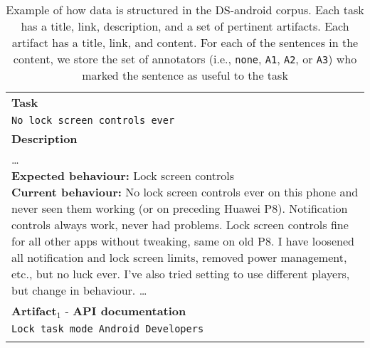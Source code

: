 \begin{landscape}
\begin{table}
\centering        
\caption{Example of how data is structured in the \acs{DS-android} corpus. Each task has a  title, link, description, and a set of pertinent artifacts. Each artifact has a title, link, and content. For each of the sentences in the content, we store the set of annotators (i.e., \texttt{none}, \texttt{A1}, \texttt{A2}, or \texttt{A3}) who marked the sentence as useful to the task }
\label{tbl:corpus-data-structure}    
\begin{scriptsize}
\begin{tabular}{cl}
\hline
\multicolumn{2}{l}{\cellcolor{lightgray}
    \textbf{Task}
}
\\
\multicolumn{2}{l}{\hspace{3mm}
\parbox[l][0.7cm][c]{16cm}{
    \texttt{No lock screen controls ever
}}}
\href{https://github.com/AntennaPod/AntennaPod/issues/3578}{link}
\\
\multicolumn{2}{l}{\cellcolor{lightgray}
    \textbf{Description}
}
\\
\multicolumn{2}{l}{
\hspace{3mm}
\parbox[l][2.5cm][c]{21cm}{
{\ttfamily
    \ldots
    \\
    \textbf{Expected behaviour:} Lock screen controls
    \\
    \textbf{Current behaviour:} No lock screen controls ever on this phone and never seen them working (or on preceding Huawei P8). Notification controls always work, never had problems. Lock screen controls fine for all other apps without tweaking, same on old P8. I have loosened all notification and lock screen limits, removed power management, etc., but no luck ever. I've also tried setting to use different players, but change in behaviour. \ldots
}}}
\\
\hline
\multicolumn{2}{l}{\cellcolor{lightgray}
    \textbf{Artifact}$_1$ - \textbf{API documentation}}
\\
\multicolumn{2}{l}{\hspace{3mm}
\parbox[l][0.7cm][c]{16cm}{
    \texttt{Lock task mode Android Developers
}}}
\href{https://developer.android.com/work/dpc/dedicated-devices/lock-task-mode}{link}
\\
\multicolumn{2}{l}{\cellcolor{lightgray}
}
\end{tabular}
\end{scriptsize}
\end{table}
\end{landscape}
